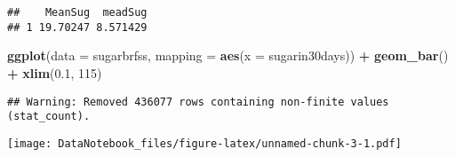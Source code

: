 \documentclass[]{article}
\newenvironment{Shaded}{\begin{snugshade}}{\end{snugshade}}
\newcommand{\KeywordTok}[1]{\textcolor[rgb]{0.13,0.29,0.53}{\textbf{#1}}}
\newcommand{\DataTypeTok}[1]{\textcolor[rgb]{0.13,0.29,0.53}{#1}}
\newcommand{\DecValTok}[1]{\textcolor[rgb]{0.00,0.00,0.81}{#1}}
\newcommand{\FloatTok}[1]{\textcolor[rgb]{0.00,0.00,0.81}{#1}}
\newcommand{\StringTok}[1]{\textcolor[rgb]{0.31,0.60,0.02}{#1}}
\newcommand{\OperatorTok}[1]{\textcolor[rgb]{0.81,0.36,0.00}{\textbf{#1}}}
\newcommand{\NormalTok}[1]{#1}
\begin{document}
\begin{Shaded}
\end{Shaded}

\begin{verbatim}
##    MeanSug  meadSug
## 1 19.70247 8.571429
\end{verbatim}

\begin{Shaded}
\begin{Highlighting}[]
\KeywordTok{ggplot}\NormalTok{(}\DataTypeTok{data =}\NormalTok{ sugarbrfss, }\DataTypeTok{mapping =} \KeywordTok{aes}\NormalTok{(}\DataTypeTok{x =}\NormalTok{ sugarin30days)) }\OperatorTok{+}\StringTok{ }\KeywordTok{geom_bar}\NormalTok{() }\OperatorTok{+}\StringTok{ }\KeywordTok{xlim}\NormalTok{(}\FloatTok{0.1}\NormalTok{, }\DecValTok{115}\NormalTok{)}
\end{Highlighting}
\end{Shaded}

\begin{verbatim}
## Warning: Removed 436077 rows containing non-finite values (stat_count).
\end{verbatim}

\texttt{[image: DataNotebook\_files/figure-latex/unnamed-chunk-3-1.pdf]}
\end{document}
